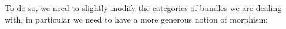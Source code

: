 \documentclass[11pt]{amsart}
\newcommand{\F}{\mathcal{F}}
\theoremstyle{plain}
\newtheorem{lemma}[theorem]{Lemma}
\theoremstyle{definition}
\theoremstyle{plain}
\theoremstyle{remark}
\DeclareMathOperator{\St}{St}
\DeclareMathOperator{\RO}{\mathsf{RO}}
\newcommand{\bool}[1]{\mathsf{#1}}
\newcommand{\0}{\mathsf{0}}
\renewcommand{\1}{\mathsf{1}}
\renewcommand{\2}{\mathsf{2}}
\theoremstyle{definition}
\begin{document}
%
%



To do so, we need to slightly modify the categories of bundles we are dealing with, in particular we need to have a more generous notion of morphism:
\end{document}
